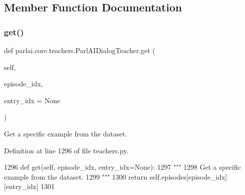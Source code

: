\subsection{Member Function Documentation}
\mbox{\label{classparlai_1_1core_1_1teachers_1_1ParlAIDialogTeacher_a0ef5a3bbad31d95bc398a393ab0a310d}} 
\subsubsection{\texorpdfstring{get()}{get()}}
{\footnotesize\ttfamily def parlai.\+core.\+teachers.\+Parl\+A\+I\+Dialog\+Teacher.\+get (\begin{DoxyParamCaption}\item[{}]{self,  }\item[{}]{episode\+\_\+idx,  }\item[{}]{entry\+\_\+idx = {\ttfamily None} }\end{DoxyParamCaption})}

\begin{DoxyVerb}Get a specific example from the dataset.
\end{DoxyVerb}
 

Definition at line 1296 of file teachers.\+py.


\begin{DoxyCode}
1296     \textcolor{keyword}{def }get(self, episode\_idx, entry\_idx=None):
1297         \textcolor{stringliteral}{"""}
1298 \textcolor{stringliteral}{        Get a specific example from the dataset.}
1299 \textcolor{stringliteral}{        """}
1300         \textcolor{keywordflow}{return} self.episodes[episode\_idx][entry\_idx]
1301 
\end{DoxyCode}
\mbox{\label{classparlai_1_1core_1_1teachers_1_1ParlAIDialogTeacher_aee1494d5dd0610530b4b93e56010e6f8}} 
